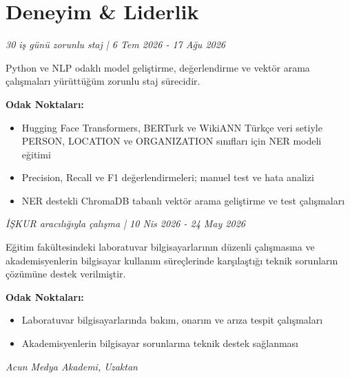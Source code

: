 \section*{Deneyim \& Liderlik}

\textit{30 iş günü zorunlu staj | 6 Tem 2026 - 17 Ağu 2026}

\vspace{0.15cm}

Python ve NLP odaklı model geliştirme, değerlendirme ve vektör arama çalışmaları yürüttüğüm zorunlu staj sürecidir.

\vspace{0.2cm}
\noindent \textbf{Odak Noktaları:}
\begin{itemize}
    \item Hugging Face Transformers, BERTurk ve WikiANN Türkçe veri setiyle PERSON, LOCATION ve ORGANIZATION sınıfları için NER modeli eğitimi
    \item Precision, Recall ve F1 değerlendirmeleri; manuel test ve hata analizi
    \item NER destekli ChromaDB tabanlı vektör arama geliştirme ve test çalışmaları
\end{itemize}

\vspace{0.45cm}

\textit{İŞKUR aracılığıyla çalışma | 10 Nis 2026 - 24 May 2026}

\vspace{0.15cm}

Eğitim fakültesindeki laboratuvar bilgisayarlarının düzenli çalışmasına ve akademisyenlerin bilgisayar kullanım süreçlerinde karşılaştığı teknik sorunların çözümüne destek verilmiştir.

\vspace{0.2cm}
\noindent \textbf{Odak Noktaları:}
\begin{itemize}
    \item Laboratuvar bilgisayarlarında bakım, onarım ve arıza tespit çalışmaları
    \item Akademisyenlerin bilgisayar sorunlarına teknik destek sağlanması
\end{itemize}

\vspace{0.45cm}

\textit{Acun Medya Akademi, Uzaktan}

